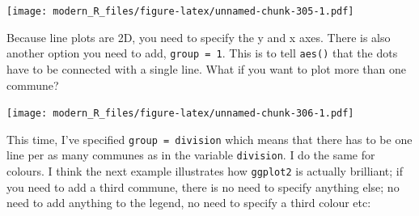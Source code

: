 \documentclass[]{gitbook}
\newenvironment{Shaded}{\begin{snugshade}}{\end{snugshade}}
\newcommand{\DataTypeTok}[1]{\textcolor[rgb]{0.13,0.29,0.53}{#1}}
\newcommand{\KeywordTok}[1]{\textcolor[rgb]{0.13,0.29,0.53}{\textbf{#1}}}
\newcommand{\NormalTok}[1]{#1}
\newcommand{\OperatorTok}[1]{\textcolor[rgb]{0.81,0.36,0.00}{\textbf{#1}}}
\newcommand{\StringTok}[1]{\textcolor[rgb]{0.31,0.60,0.02}{#1}}
\theoremstyle{definition}
\theoremstyle{definition}
\theoremstyle{definition}
\theoremstyle{remark}
\begin{document}
\texttt{[image: modern\_R\_files/figure-latex/unnamed-chunk-305-1.pdf]}

Because line plots are 2D, you need to specify the y and x axes. There
is also another option you need to add, \texttt{group\ =\ 1}. This is to
tell \texttt{aes()} that the dots have to be connected with a single
line. What if you want to plot more than one commune?

\begin{Shaded}
\end{Shaded}

\texttt{[image: modern\_R\_files/figure-latex/unnamed-chunk-306-1.pdf]}

This time, I've specified \texttt{group\ =\ division} which means that
there has to be one line per as many communes as in the variable
\texttt{division}. I do the same for colours. I think the next example
illustrates how \texttt{ggplot2} is actually brilliant; if you need to
add a third commune, there is no need to specify anything else; no need
to add anything to the legend, no need to specify a third colour etc:

\begin{Shaded}
\end{Shaded}
\end{document}
